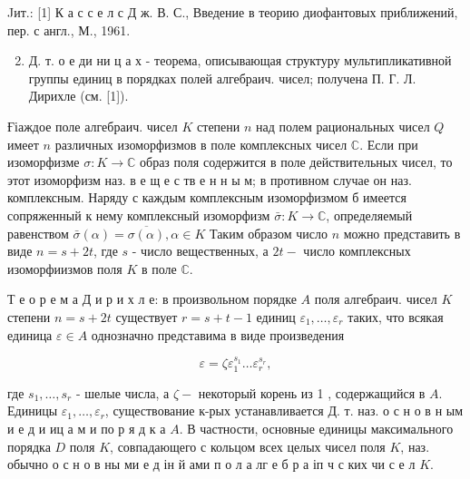 \documentclass[10pt]{article}
\begin{document}
Jит.: [1] К а с с е л с Д ж. В. С., Введение в теорию диофантовых приближений, пер. с англ., М., 1961.



\begin{enumerate}

  \setcounter{enumi}{1}

  \item Д. т. о е ди ни ц а х - теорема, описывающая структуру мультипликативной группы единиц в порядках полей алгебраич. чисел; получена П. Г. Л. Дирихле (см. [1]).

\end{enumerate}



Ғіаждое поле алгебраич. чисел $K$ степени $n$ над полем рациональных чисел $Q$ имеет $n$ различных изоморфизмов в поле комплексных чисел $\mathbb{C}$. Если при изоморфизме $\sigma: K \rightarrow \mathbb{C}$ образ поля содержится в поле действительных чисел, то этот изоморфизм наз. в е щ е с тв е н н ы м; в противном случае он наз. комплексным. Наряду с каждым комплексным изоморфизмом б имеется сопряженный к нему комплексный изоморфизм $\bar{\sigma}: K \rightarrow \mathbb{C}$, определяемый равенством $\bar{\sigma}(\alpha)=\overline{\sigma(\alpha)}, \alpha \in K$ Таким образом число $n$ можно представить в виде $n=s+2 t$, где $s$ - число вещественных, а $2 t-$ число комплексных изоморфиизмов поля $K$ в поле $\mathbb{C}$.



Т е о р е м а Д и р и х л е: в произвольном порядке $A$ поля алгебраич. чисел $K$ степени $n=s+2 t$ существует $r=s+t-1$ единиц $\varepsilon_{1}, \ldots, \varepsilon_{r}$ таких, что всякая единица $\varepsilon \in A$ однозначно представима в виде произведения



\[

\varepsilon=\zeta \varepsilon_{1}^{s_{1}} \ldots \varepsilon_{r}^{s_{r}},

\]



где $s_{1}, \ldots, s_{r}$ - шелые числа, а $\zeta-$ некоторый корень из 1 , содержащийся в $A$. Единицы $\varepsilon_{1}, \ldots, \varepsilon_{r}$, существование к-рых устанавливается Д. т. наз. о с н о в н ым и е д и иц а м и по р я д к а $A$. В частности, основные единицы максимального порядка $D$ поля $K$, совпадающего с кольцом всех целых чисел поля $K$, наз. обычно о с н о в ны ми е д ін й ами п о л а лг е б р а іп ч с ких чи с е л $K$.
\end{document}

